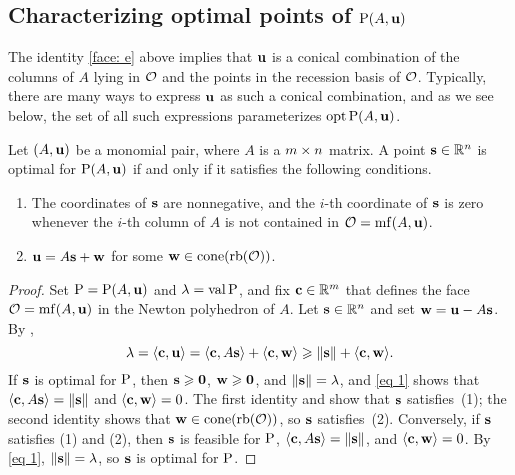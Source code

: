 \documentclass[11pt]{amsart}
\begin{document}
\subsection{Characterizing optimal points of $\mathrm{P}(A,\mathbf{u})$}

The identity \eqref{face: e} above implies that
$\mathbf{u}$ is a conical combination of the columns of $A$ lying in $\mathcal{O}$ and the points in the recession basis of $\mathcal{O}$.
Typically, there are many ways to express $\mathbf{u}$ as such a conical combination, and as we see below, the set of all such expressions parameterizes  $\operatorname{opt} \mathrm{P}(A, \mathbf{u})$.

\begin{proposition}\label{opt set: P}
   Let $(A,\mathbf{u})$ be a monomial pair, where $A$ is a $m\times n$ matrix.
   A point $\mathbf{s} \in \mathbb{R}^n$ is optimal for $\mathrm{P}(A, \mathbf{u})$ if and only if it satisfies the following conditions.
\begin{enumerate}
\item  \label{mc coords: e} The coordinates of $\mathbf{s}$ are nonnegative, and the $i$-th coordinate of $\mathbf{s}$ is zero whenever the $i$-th column of $A$ is not contained in $\mathcal{O} = \operatorname{mf}(A, \mathbf{u})$.
\item  \label{mc decomposition: e} $\mathbf{u} = A \mathbf{s} + \mathbf{w}$ for some $\mathbf{w} \in  \operatorname{cone}(\operatorname{rb}(\mathcal{O}))$.
\end{enumerate}
\end{proposition}

\begin{proof}
   Set $\mathrm{P} = \mathrm{P}(A, \mathbf{u})$ and $\lambda = \operatorname{val} \mathrm{P} $, and fix $\mathbf{c} \in \mathbb{R}^m$ that defines the face $\mathcal{O} = \operatorname{mf}(A, \mathbf{u})$ in the Newton polyhedron of $A$.
   Let $\mathbf{s} \in \mathbb{R}^n$ and set $\mathbf{w} = \mathbf{u} - A\mathbf{s}$.
   By ,
   \begin{equation}\label{eq 1}
      \lambda = \langle \mathbf{c}, \mathbf{u} \rangle = \langle \mathbf{c}, A \mathbf{s} \rangle + \langle \mathbf{c}, \mathbf{w} \rangle \geqslant \| \mathbf{s} \| + \langle \mathbf{c}, \mathbf{w} \rangle.
   \end{equation}
   If $\mathbf{s}$ is optimal for $\mathrm{P}$, then $\mathbf{s} \geqslant \mathbf{0}$, $\mathbf{w} \geqslant \mathbf{0}$, and $\| \mathbf{s} \| = \lambda$, and \eqref{eq 1} shows that $\langle \mathbf{c}, A \mathbf{s} \rangle = \| \mathbf{s} \|$ and $\langle \mathbf{c}, \mathbf{w} \rangle = 0$.
   The first identity and  show that $\mathbf{s}$ satisfies~(1); the second identity shows that $\mathbf{w}\in \operatorname{cone}(\operatorname{rb}(\mathcal{O}))$, so $\mathbf{s}$ satisfies~(2).
   Conversely, if $\mathbf{s}$ satisfies (1) and (2), then $\mathbf{s}$ is feasible for $\mathrm{P}$, $\langle \mathbf{c}, A \mathbf{s} \rangle = \| \mathbf{s} \|$, and $\langle \mathbf{c}, \mathbf{w} \rangle = 0$.
   By \eqref{eq 1}, $\| \mathbf{s} \| = \lambda$, so $\mathbf{s}$ is optimal for $\mathrm{P}$.
\end{proof}
\end{document}
